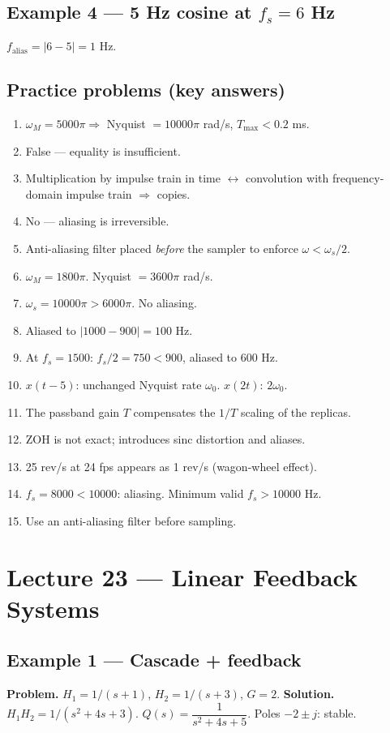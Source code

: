 \documentclass[11pt]{article}
\begin{document}
\subsection{Example 4 --- 5 Hz cosine at $f_s=6$ Hz}
$f_\text{alias}=|6-5|=1$ Hz.

\subsection{Practice problems (key answers)}
\begin{enumerate}[label=P\arabic*., leftmargin=*]
\item $\omega_M=5000\pi\Rightarrow$ Nyquist $=10000\pi$ rad/s, $T_\max<0.2$ ms.
\item False --- equality is insufficient.
\item Multiplication by impulse train in time $\leftrightarrow$ convolution with frequency-domain impulse train $\Rightarrow$ copies.
\item No --- aliasing is irreversible.
\item Anti-aliasing filter placed \emph{before} the sampler to enforce $\omega<\omega_s/2$.
\item $\omega_M=1800\pi$. Nyquist $=3600\pi$ rad/s.
\item $\omega_s=10000\pi>6000\pi$. No aliasing.
\item Aliased to $|1000-900|=100$ Hz.
\item At $f_s=1500$: $f_s/2=750<900$, aliased to $600$ Hz.
\item $x(t-5)$: unchanged Nyquist rate $\omega_0$. $x(2t)$: $2\omega_0$.
\item The passband gain $T$ compensates the $1/T$ scaling of the replicas.
\item ZOH is not exact; introduces sinc distortion and aliases.
\item 25 rev/s at 24 fps appears as 1 rev/s (wagon-wheel effect).
\item $f_s=8000<10000$: aliasing. Minimum valid $f_s>10000$ Hz.
\item Use an anti-aliasing filter before sampling.
\end{enumerate}

\section{Lecture 23 --- Linear Feedback Systems}

\subsection{Example 1 --- Cascade + feedback}
\textbf{Problem.} $H_1=1/(s+1)$, $H_2=1/(s+3)$, $G=2$.
\textbf{Solution.} $H_1H_2=1/(s^2+4s+3)$. $Q(s)=\dfrac{1}{s^2+4s+5}$. Poles $-2\pm j$: stable.
\end{document}
